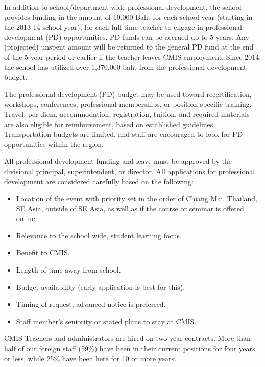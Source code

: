 
In addition to school/department wide professional development, the school provides funding in the amount of 10,000 Baht for each school year (starting in the 2013-14 school year), for each full-time teacher to engage in professional development (PD) opportunities.  PD funds can be accrued up to 5 years. Any (projected) unspent amount will be returned to the general PD fund at the end of the 5-year period or earlier if the teacher leaves CMIS employment. Since 2014, the school has utilized over 1,370,000 baht from the professional development budget.

The professional development (PD) budget may be used toward recertification, workshops, conferences, professional memberships, or position-specific training.  Travel, per diem, accommodation, registration, tuition, and required materials are also eligible for reimbursement, based on established guidelines.  Transportation budgets are limited, and staff are encouraged to look for PD opportunities within the region.  

All professional development funding and leave must be approved by the divisional principal, superintendent, or director.  All applications for professional development are considered carefully based on the following:

\begin{itemize}
\item Location of the event with priority set in the order of Chiang Mai, Thailand, SE Asia, outside of SE Asia, as well as if the course or seminar is offered online.
\item Relevance to the school wide, student learning focus.
\item Benefit to CMIS.
\item Length of time away from school.
\item Budget availability (early application is best for this).
\item Timing of request, advanced notice is preferred.
\item Staff member’s seniority or stated plans to stay at CMIS.
\end{itemize}


CMIS Teachers and administrators are hired on two-year contracts.  More than half of our foreign staff (59\%) have been in their current positions for four years or less, while 25\% have been here for 10 or more years. 

